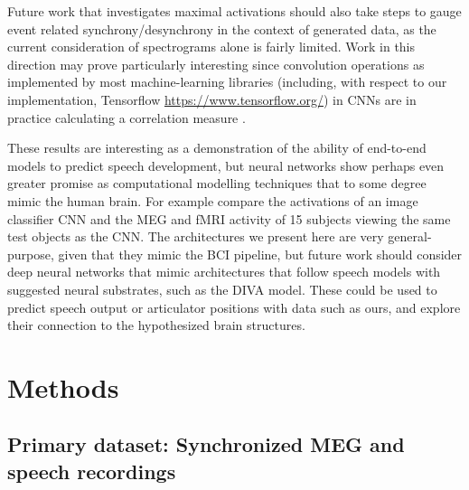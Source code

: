 \documentclass[fleqn,10pt]{wlscirep}
\begin{document}
Future work that investigates maximal activations should also take steps to gauge event related synchrony/desynchrony in the context of generated data, as the current consideration of spectrograms alone is fairly limited. Work in this direction may prove particularly interesting since convolution operations as implemented by most machine-learning libraries (including, with respect to our implementation, Tensorflow \url{https://www.tensorflow.org/}) in CNNs are in practice calculating a correlation measure \cite{GravesRNNBook}.

These results are interesting as a demonstration of the ability of end-to-end models to predict speech development, but neural networks show perhaps even greater promise as computational modelling techniques that to some degree mimic the human brain. For example \cite{cichy2016} compare the activations of an image classifier CNN and the MEG and fMRI activity of 15 subjects viewing the same test objects as the CNN. The architectures we present here are very general-purpose, given that they mimic the BCI pipeline, but future work should consider deep neural networks that mimic architectures that follow speech models with suggested neural substrates, such as the DIVA model\cite{Guenther2005}. These could be used to predict speech output or articulator positions with data such as ours, and explore their connection to the hypothesized brain structures.

\section*{Methods}

\subsection*{Primary dataset: Synchronized MEG and speech recordings}
\end{document}
